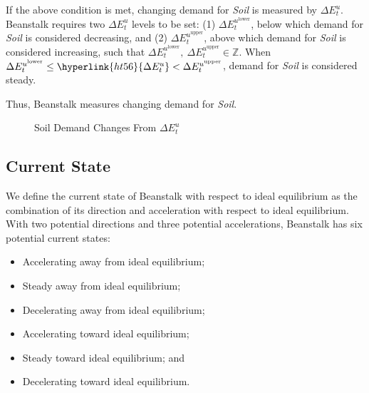 \documentclass[tikz]{article}
\newcommand{\term}[1]{\textsl{#1}}
\begin{document}
\newpage

If the above condition is met, changing demand for \term{Soil} is measured by \hyperlink{ht56}{$\Delta E_{t}^{u}$}. Beanstalk requires two \hyperlink{ht56}{$\Delta E_{t}^{u}$} levels to be set: (1) $\Delta E_{t}^{u^{\text{lower}}}$, below which demand for \term{Soil} is considered decreasing, and (2) $\Delta E_{t}^{u^{\text{upper}}}$, above which demand for \term{Soil} is considered increasing, such that $\Delta E_{t}^{u^{\text{lower}}},\ \Delta E_{t}^{u^{\text{upper}}} \in \mathbb{Z}$. When $\Delta E_{t}^{u^{\text{lower}}} \leq \hyperlink{ht56}{\Delta E_{t}^{u}} < \Delta E_{t}^{u^{\text{upper}}}$, demand for \term{Soil} is considered steady.

Thus, Beanstalk measures changing demand for \term{Soil}.

\begin{figure}[h!]
    \centering
    
    \vspace*{-10.5mm} %
    \setlength{\belowcaptionskip}{-8pt} %
    \caption{Soil Demand Changes From $\Delta E_{t}^{u}$}
    \label{Fig 9}
\end{figure}

\subsection{Current State}

We define the current state of Beanstalk with respect to ideal equilibrium as the combination of its direction and acceleration with respect to ideal equilibrium. With two potential directions and three potential accelerations, Beanstalk has six potential current states:
\begin{multicols}{2}
\begin{itemize}[midsep]
    \item Accelerating away from ideal equilibrium;
    \item Steady away from ideal equilibrium;
    \item Decelerating away from ideal equilibrium;
    \item Accelerating toward ideal equilibrium;
    \item Steady toward ideal equilibrium; and
    \item Decelerating toward ideal equilibrium.
\end{itemize}
\end{multicols}
\end{document}
